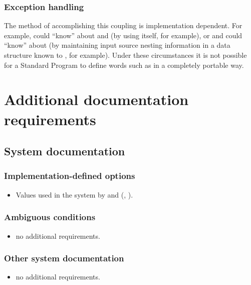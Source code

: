 \begin{info}
\subsubsection{Exception handling}

The method of accomplishing this coupling is implementation dependent.
For example,  could ``know'' about  and
 (by using  itself, for example), or
 and  could ``know'' about 
(by maintaining input source nesting information in a data structure
known to , for example). Under these circumstances it is
not possible for a Standard Program to define words such as
 in a completely portable way.
\end{info}

\section{Additional documentation requirements} %

\subsection{System documentation} %

\subsubsection{Implementation-defined options} %
\begin{itemize}
\item Values used in the system by  and
	(,
	 ).
\end{itemize}

\subsubsection{Ambiguous conditions} %
\begin{itemize}
\item no additional requirements.
\end{itemize}

\subsubsection{Other system documentation} %
\begin{itemize}
\item no additional requirements.
\end{itemize}

